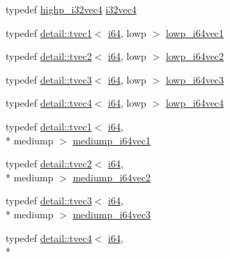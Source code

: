 \begin{DoxyCompactItemize}
\item 
typedef \hyperlink{group__gtc__type__precision_ga174af0fafdc5a9eb24150792bffa8b5c}{highp\-\_\-i32vec4} \hyperlink{group__gtc__type__precision_ga5fea6ade2c848bca1fa55636e75a10b9}{i32vec4}
\item 
typedef \hyperlink{structglm_1_1detail_1_1tvec1}{detail\-::tvec1}$<$ \hyperlink{group__gtc__type__precision_gac7a7eaad46064fc952b06df33689da23}{i64}, lowp $>$ \hyperlink{group__gtc__type__precision_gaf427ced1906a1788fdd9faab2e57c60a}{lowp\-\_\-i64vec1}
\item 
typedef \hyperlink{structglm_1_1detail_1_1tvec2}{detail\-::tvec2}$<$ \hyperlink{group__gtc__type__precision_gac7a7eaad46064fc952b06df33689da23}{i64}, lowp $>$ \hyperlink{group__gtc__type__precision_gad88a04aaa07fabf57fdbad8e6b7bcc9c}{lowp\-\_\-i64vec2}
\item 
typedef \hyperlink{structglm_1_1detail_1_1tvec3}{detail\-::tvec3}$<$ \hyperlink{group__gtc__type__precision_gac7a7eaad46064fc952b06df33689da23}{i64}, lowp $>$ \hyperlink{group__gtc__type__precision_gaa42f666ccdb6d1ef6326882b4f377678}{lowp\-\_\-i64vec3}
\item 
typedef \hyperlink{structglm_1_1detail_1_1tvec4}{detail\-::tvec4}$<$ \hyperlink{group__gtc__type__precision_gac7a7eaad46064fc952b06df33689da23}{i64}, lowp $>$ \hyperlink{group__gtc__type__precision_ga95c13b9d4f94d1783e7d96534d1651d8}{lowp\-\_\-i64vec4}
\item 
typedef \hyperlink{structglm_1_1detail_1_1tvec1}{detail\-::tvec1}$<$ \hyperlink{group__gtc__type__precision_gac7a7eaad46064fc952b06df33689da23}{i64}, \\*
mediump $>$ \hyperlink{group__gtc__type__precision_gad2423a91c791b9ca2f8a3ecfc71b080d}{mediump\-\_\-i64vec1}
\item 
typedef \hyperlink{structglm_1_1detail_1_1tvec2}{detail\-::tvec2}$<$ \hyperlink{group__gtc__type__precision_gac7a7eaad46064fc952b06df33689da23}{i64}, \\*
mediump $>$ \hyperlink{group__gtc__type__precision_ga5cf0bec13b01b6124e966360cffe15a4}{mediump\-\_\-i64vec2}
\item 
typedef \hyperlink{structglm_1_1detail_1_1tvec3}{detail\-::tvec3}$<$ \hyperlink{group__gtc__type__precision_gac7a7eaad46064fc952b06df33689da23}{i64}, \\*
mediump $>$ \hyperlink{group__gtc__type__precision_gae1aa82d2b9a62a87648306205dfe69ab}{mediump\-\_\-i64vec3}
\item 
typedef \hyperlink{structglm_1_1detail_1_1tvec4}{detail\-::tvec4}$<$ \hyperlink{group__gtc__type__precision_gac7a7eaad46064fc952b06df33689da23}{i64}, \\*

\end{DoxyCompactItemize}
